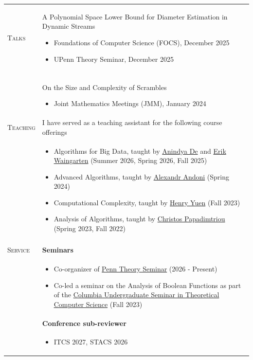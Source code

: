 \documentclass[10pt]{article}
\newlength{\lcol}\setlength{\lcol}{100pt}
\newlength{\rcol}\setlength{\rcol}{\dimexpr\textwidth-\lcol\relax}
\newcommand{\sectionhead}[1]{\textsc{#1}}
\begin{document}
\begin{longtable}{@{}p{\lcol}@{}p{\rcol}@{}}
\sectionhead{Talks} &
\textcolor{customlinkcolor}{A Polynomial Space Lower Bound for Diameter Estimation in Dynamic Streams}
\begin{itemize}
  \item Foundations of Computer Science (FOCS), December 2025
  \item UPenn Theory Seminar, December 2025
\end{itemize}\\ \\
& \textcolor{customlinkcolor}{On the Size and Complexity of Scrambles}
\begin{itemize}
  \item Joint Mathematics Meetings (JMM), January 2024
\end{itemize}
\\ [5pt]

\sectionhead{Teaching} &
I have served as a teaching assistant for the following course offerings \\
& \begin{itemize}
  \item Algorithms for Big Data, taught by \href{https://www.engineering.upenn.edu/~anindyad/}{Anindya De} and \href{https://sites.google.com/site/erikwaing/home}{Erik Waingarten} (Summer 2026, Spring 2026, Fall 2025)
  \item Advanced Algorithms, taught by \href{https://www.cs.columbia.edu/~andoni/}{Alexandr Andoni} (Spring 2024)
  \item Computational Complexity, taught by \href{https://www.henryyuen.net/}{Henry Yuen} (Fall 2023)
  \item Analysis of Algorithms, taught by \href{https://www.engineering.columbia.edu/faculty-staff/directory/christos-papadimitriou}{Christos Papadimtriou} (Spring 2023, Fall 2022)
\end{itemize} \\ \\
 

\sectionhead{Service} &
\textbf{Seminars} \\
& \begin{itemize}
  \item Co-organizer of \href{https://theory.cis.upenn.edu/seminar/}{Penn Theory Seminar} (2026 - Present)
  \item Co-led a seminar on the Analysis of Boolean Functions as part of the \href{https://columbia-ugtcs.github.io/fall2023.html}{Columbia Undergraduate Seminar in Theoretical Computer Science} (Fall 2023)
\end{itemize} \\ [2pt]
& \textbf{Conference sub-reviewer}\\
& \begin{itemize}
  \item ITCS 2027, STACS 2026
\end{itemize} \\ [4pt]


\end{longtable}
\end{document}
